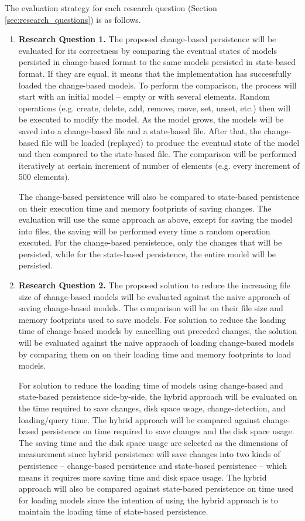 \documentclass[12pt, a4paper]{report} \usepackage[titletoc]{appendix}
\begin{document}
The evaluation strategy for each research question (Section \ref{sec:research_questions}) is as follows. 
\begin{enumerate}
    \item \textbf{Research Question 1.} The proposed change-based persistence will be evaluated for its correctness by comparing the eventual states of models persisted in change-based format to the same models persisted in state-based format. If they are equal, it means that the implementation has successfully loaded the change-based models. To perform the comparison, the process will start with an initial model -- empty or with several elements. Random operations (e.g. create, delete, add, remove, move, set, unset, etc.) then will be executed to modify the model. As the model grows, the models will be saved into a change-based file and a state-based file. After that, the change-based file will be loaded (replayed) to produce the eventual state of the model and then compared to the state-based file. The comparison will be performed iteratively at certain increment of number of elements (e.g. every increment of 500 elements). 
    
    The change-based persistence will also be compared to state-based persistence on their execution time and memory footprints of saving changes. The evaluation will use the same approach as above, except for saving the model into files, the saving will be performed every time a random operation executed. For the change-based persistence, only the changes that will be persisted, while for the state-based persistence, the entire model will be persisted.
    
    \item \textbf{Research Question 2.} The proposed solution to reduce the increasing file size of change-based models will be evaluated against the naive approach of saving change-based models. The comparison will be on their file size and memory footprints used to save models. For solution to reduce the loading time of change-based models by cancelling out preceded changes, the solution will be evaluated against the naive appraoch of loading change-based models by comparing them on on their loading time and memory footprints to load models. 
    
    For solution to reduce the loading time of models using change-based and state-based persistence side-by-side,  the hybrid approach will be evaluated on the time required to save changes, disk space usage, change-detection, and loading/query time. The hybrid approach will be compared against change-based persistence on time required to save changes and the disk space usage. The saving time and the disk space usage are selected as the dimensions of measurement since hybrid persistence will save changes into two kinds of persistence -- change-based persistence and state-based persistence -- which means it requires more saving time and disk space usage. The hybrid approach will also be compared against state-based persistence on time used for loading models since the intention of using the hybrid approach is to maintain the loading time of state-based persistence. 
    

\end{enumerate}
\end{document}
